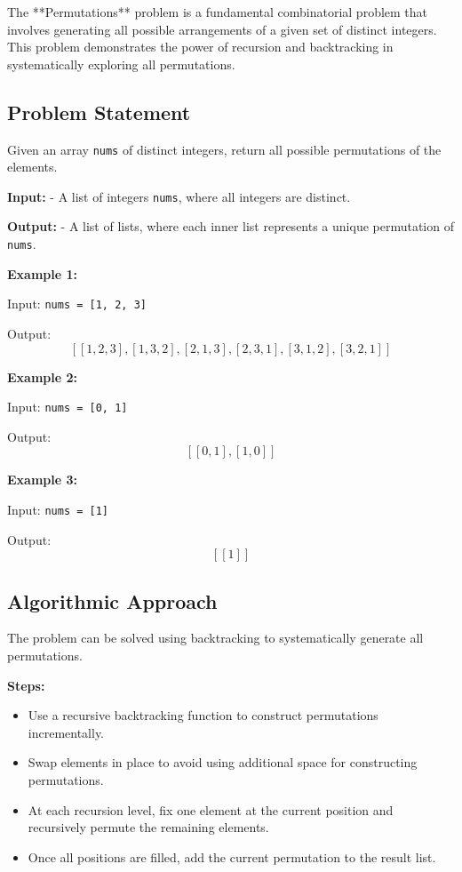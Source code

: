
\label{problem:Permutations}

The **Permutations** problem is a fundamental combinatorial problem that involves generating all possible arrangements of a given set of distinct integers. This problem demonstrates the power of recursion and backtracking in systematically exploring all permutations.

\subsection*{Problem Statement}
Given an array \texttt{nums} of distinct integers, return all possible permutations of the elements.

\textbf{Input:}
- A list of integers \texttt{nums}, where all integers are distinct.

\textbf{Output:}
- A list of lists, where each inner list represents a unique permutation of \texttt{nums}.

\textbf{Example 1:}

Input: \texttt{nums = [1, 2, 3]}

Output: \[
\left[
[1, 2, 3], [1, 3, 2], [2, 1, 3], [2, 3, 1], [3, 1, 2], [3, 2, 1]
\right]
\]

\textbf{Example 2:}

Input: \texttt{nums = [0, 1]}

Output: \[
\left[
[0, 1], [1, 0]
\right]
\]

\textbf{Example 3:}

Input: \texttt{nums = [1]}

Output: \[
\left[
[1]
\right]
\]

\subsection*{Algorithmic Approach}
The problem can be solved using backtracking to systematically generate all permutations.

\textbf{Steps:}
\begin{itemize}
    \item Use a recursive backtracking function to construct permutations incrementally.
    \item Swap elements in place to avoid using additional space for constructing permutations.
    \item At each recursion level, fix one element at the current position and recursively permute the remaining elements.
    \item Once all positions are filled, add the current permutation to the result list.
\end{itemize}


